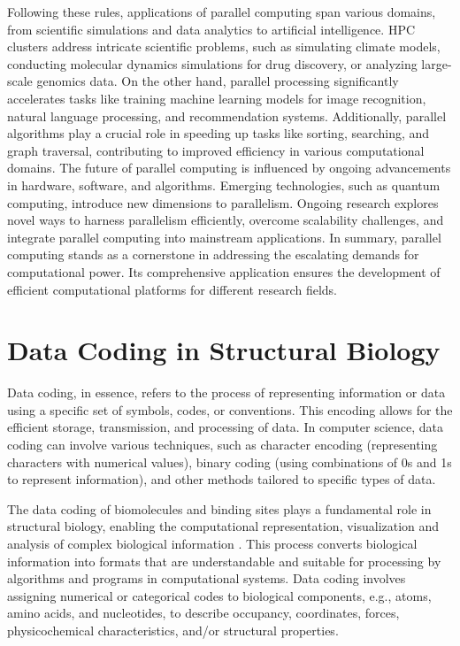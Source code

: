 \documentclass[Ingles]{phdthesis}
\def\eg{e.g.\onedot}
\begin{document}
Following these rules, applications of parallel computing span various domains, from scientific simulations and data analytics to artificial intelligence. \ac{HPC} clusters address intricate scientific problems, such as simulating climate models, conducting molecular dynamics simulations for drug discovery, or analyzing large-scale genomics data. On the other hand, parallel processing significantly accelerates tasks like training machine learning models for image recognition, natural language processing, and recommendation systems. Additionally, parallel algorithms play a crucial role in speeding up tasks like sorting, searching, and graph traversal, contributing to improved efficiency in various computational domains. The future of parallel computing is influenced by ongoing advancements in hardware, software, and algorithms. Emerging technologies, such as quantum computing, introduce new dimensions to parallelism. Ongoing research explores novel ways to harness parallelism efficiently, overcome scalability challenges, and integrate parallel computing into mainstream applications. In summary, parallel computing stands as a cornerstone in addressing the escalating demands for computational power. Its comprehensive application ensures the development of efficient computational platforms for different research fields.


\chapter{Data Coding in Structural Biology}

Data coding, in essence, refers to the process of representing information or data using a specific set of symbols, codes, or conventions. This encoding allows for the efficient storage, transmission, and processing of data. In computer science, data coding can involve various techniques, such as character encoding (representing characters with numerical values), binary coding (using combinations of 0s and 1s to represent information), and other methods tailored to specific types of data.

The data coding of biomolecules and binding sites plays a fundamental role in structural biology, enabling the computational representation, visualization and analysis of complex biological information \cite{kozlikova2016}. This process converts biological information into formats that are understandable and suitable for processing by algorithms and programs in computational systems. Data coding involves assigning numerical or categorical codes to biological components, \eg, atoms, amino acids, and nucleotides, to describe occupancy, coordinates, forces, physicochemical characteristics, and/or structural properties.
\end{document}
